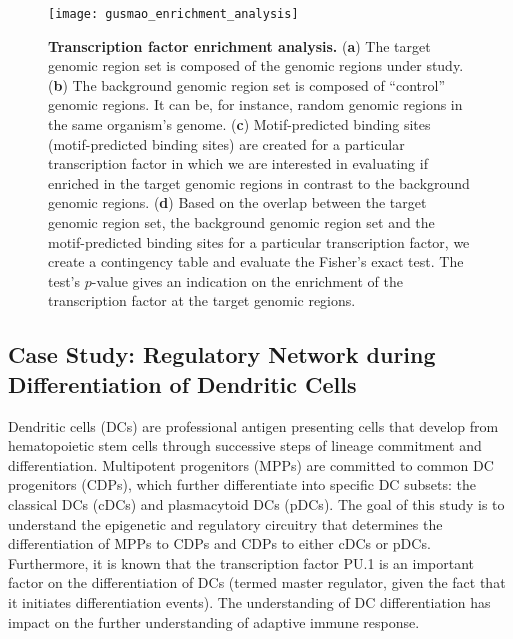 \begin{figure}[h!]
\centering
\texttt{[image: gusmao\_enrichment\_analysis]}
\caption[Transcription factor enrichment analysis]{\textbf{Transcription factor enrichment analysis.} (\textbf{a}) The target genomic region set is composed of the genomic regions under study. (\textbf{b}) The background genomic region set is composed of ``control'' genomic regions. It can be, for instance, random genomic regions in the same organism's genome. (\textbf{c}) Motif-predicted binding sites (motif-predicted binding sites) are created for a particular transcription factor in which we are interested in evaluating if enriched in the target genomic regions in contrast to the background genomic regions. (\textbf{d}) Based on the overlap between the target genomic region set, the background genomic region set and the motif-predicted binding sites for a particular transcription factor, we create a contingency table and evaluate the Fisher's exact test. The test's $p$-value gives an indication on the enrichment of the transcription factor at the target genomic regions.}
\label{fig:gusmao_enrichment_analysis}
\end{figure}

\subsection{Case Study: Regulatory Network during Differentiation of Dendritic Cells}
\label{sec:case.study.dendritic}

Dendritic cells (DCs) are professional antigen presenting cells that develop from hematopoietic stem cells through successive steps of lineage commitment and differentiation. Multipotent progenitors (MPPs) are committed to common DC progenitors (CDPs), which further differentiate into specific DC subsets: the classical DCs (cDCs) and plasmacytoid DCs (pDCs). The goal of this study is to understand the epigenetic and regulatory circuitry that determines the differentiation of MPPs to CDPs and CDPs to either cDCs or pDCs. Furthermore, it is known that the transcription factor PU.1 is an important factor on the differentiation of DCs (termed master regulator, given the fact that it initiates differentiation events). The understanding of DC differentiation has impact on the further understanding of adaptive immune response.

